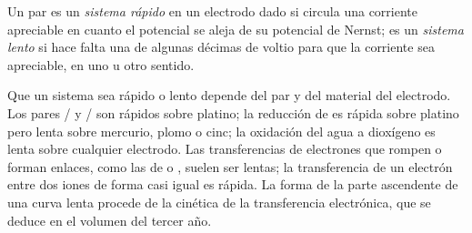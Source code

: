 \begin{definition}\label{def:b2:current-potential-curves:fast-slow}
Un par es un \emph{sistema rápido} en un electrodo dado si
circula una corriente apreciable en cuanto el potencial se aleja de su potencial de
Nernst; es un \emph{sistema lento} si hace falta una  de
algunas décimas de voltio para que la corriente sea apreciable, en
uno u otro sentido.
\end{definition}

Que un sistema sea rápido o lento depende del par y del material del
electrodo. Los pares / y / son rápidos sobre
platino; la reducción de  es rápida sobre platino pero lenta sobre mercurio,
plomo o cinc; la oxidación del agua a dioxígeno es lenta sobre cualquier electrodo.
Las transferencias de electrones que rompen o forman enlaces, como las de  o ,
suelen ser lentas; la transferencia de un electrón entre dos iones de forma casi
igual es rápida. La forma de la parte ascendente de una curva lenta procede de
la cinética de la transferencia electrónica, que se deduce en el volumen del tercer año.

